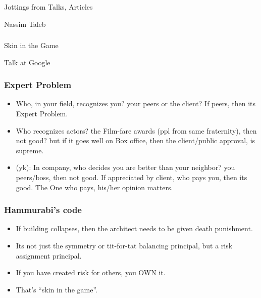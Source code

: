 \begin{frame}[fragile]\frametitle{}
\begin{center}
{\Large Jottings from Talks, Articles}

{\small Nassim Taleb}


\end{center}
\end{frame}



\begin{frame}[fragile]\frametitle{}
\begin{center}
{\large Skin in the Game}

{\small Talk at Google}


\end{center}
\end{frame}



\begin{frame}[fragile]\frametitle{Expert Problem}

\begin{itemize}
\item Who, in your field, recognizes you? your peers or the client? If peers, then its Expert Problem.
\item Who recognizes actors? the Film-fare awards (ppl from same fraternity), then not good? but if it goes well on Box office, then the client/public approval, is supreme.
\item (yk): In company, who decides you are better than your neighbor? you peers/boss, then not good. If appreciated by client, who pays you, then its good.
The One who pays, his/her opinion matters.
\end{itemize}

\end{frame}


\begin{frame}[fragile]\frametitle{Hammurabi's code}

\begin{itemize}
\item If building collapses, then the architect needs to be given death punishment.
\item Its not just the symmetry or  tit-for-tat balancing principal, but a risk assignment principal.
\item If you have created risk for others, you OWN it.

\item That's ``skin in the game''.
\end{itemize}
\end{frame}

